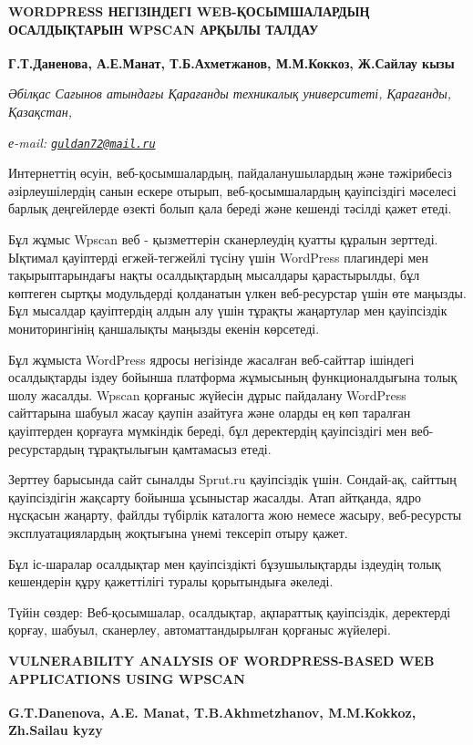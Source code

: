 \begin{articleheader}
{\bfseries WORDPRESS НЕГІЗІНДЕГІ WEB-ҚОСЫМШАЛАРДЫҢ ОСАЛДЫҚТАРЫН WPSCAN АРҚЫЛЫ ТАЛДАУ}

{\bfseries Г.Т.Даненова\textsuperscript{\envelope },
А.Е.Манат,
Т.Б.Ахметжанов,
М.М.Коккоз,
Ж.Сайлау кызы}
\end{articleheader}

\begin{affiliation}
\emph{Әбілқас Сағынов атындағы Қарағанды техникалық университеті, Қарағанды, Қазақстан,}

\emph{е-mail: \href{mailto:guldan72@mail.ru}{\nolinkurl{guldan72@mail.ru}}}
\end{affiliation}

Интернеттің өсуін, веб-қосымшалардың, пайдаланушылардың және тәжірибесіз
әзірлеушілердің санын ескере отырып, веб-қосымшалардың қауіпсіздігі
мәселесі барлық деңгейлерде өзекті болып қала береді және кешенді
тәсілді қажет етеді.

Бұл жұмыс Wpscan веб - қызметтерін сканерлеудің қуатты құралын зерттеді.
Ықтимал қауіптерді егжей-тегжейлі түсіну үшін WordPress плагиндері мен
тақырыптарындағы нақты осалдықтардың мысалдары қарастырылды, бұл
көптеген сыртқы модульдерді қолданатын үлкен веб-ресурстар үшін өте
маңызды. Бұл мысалдар қауіптердің алдын алу үшін тұрақты жаңартулар мен
қауіпсіздік мониторингінің қаншалықты маңызды екенін көрсетеді.

Бұл жұмыста WordPress ядросы негізінде жасалған веб-сайттар ішіндегі
осалдықтарды іздеу бойынша платформа жұмысының функционалдығына толық
шолу жасалды. Wpscan қорғаныс жүйесін дұрыс пайдалану WordPress
сайттарына шабуыл жасау қаупін азайтуға және оларды ең көп таралған
қауіптерден қорғауға мүмкіндік береді, бұл деректердің қауіпсіздігі мен
веб-ресурстардың тұрақтылығын қамтамасыз етеді.

Зерттеу барысында сайт сыналды Sprut.ru қауіпсіздік үшін. Сондай-ақ,
сайттың қауіпсіздігін жақсарту бойынша ұсыныстар жасалды. Атап айтқанда,
ядро нұсқасын жаңарту, файлды түбірлік каталогта жою немесе жасыру,
веб-ресурсты эксплуатациялардың жоқтығына үнемі тексеріп отыру қажет.

Бұл іс-шаралар осалдықтар мен қауіпсіздікті бұзушылықтарды іздеудің
толық кешендерін құру қажеттілігі туралы қорытындыға әкеледі.

Түйін сөздер: Веб-қосымшалар, осалдықтар, ақпараттық қауіпсіздік,
деректерді қорғау, шабуыл, сканерлеу, автоматтандырылған қорғаныс
жүйелері.

\begin{articleheader}
{\bfseries VULNERABILITY ANALYSIS OF WORDPRESS-BASED WEB APPLICATIONS USING WPSCAN}

{\bfseries
G.T.Danenova\textsuperscript{\envelope },
A.E. Manat,
T.B.Akhmetzhanov,
M.M.Kokkoz,
Zh.Sailau kyzy}
\end{articleheader}

